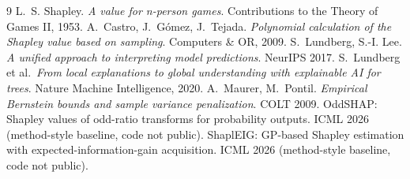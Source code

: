 \documentclass[11pt,twocolumn]{article}
\begin{document}

\begin{thebibliography}{9}
 L.~S. Shapley. \emph{A value for n-person games}.
Contributions to the Theory of Games II, 1953.
 A.~Castro, J.~G\'omez, J.~Tejada. \emph{Polynomial
calculation of the Shapley value based on sampling}. Computers \& OR, 2009.
 S.~Lundberg, S.-I. Lee. \emph{A unified approach to
interpreting model predictions}. NeurIPS 2017.
 S.~Lundberg et al.\ \emph{From local explanations to
global understanding with explainable AI for trees}. Nature Machine
Intelligence, 2020.
 A.~Maurer, M.~Pontil. \emph{Empirical Bernstein bounds
and sample variance penalization}. COLT 2009.
 OddSHAP: Shapley values of odd-ratio transforms for
probability outputs. ICML 2026 (method-style baseline, code not public).
 ShaplEIG: GP-based Shapley estimation with
expected-information-gain acquisition. ICML 2026 (method-style baseline,
code not public).
\end{thebibliography}
\end{document}
